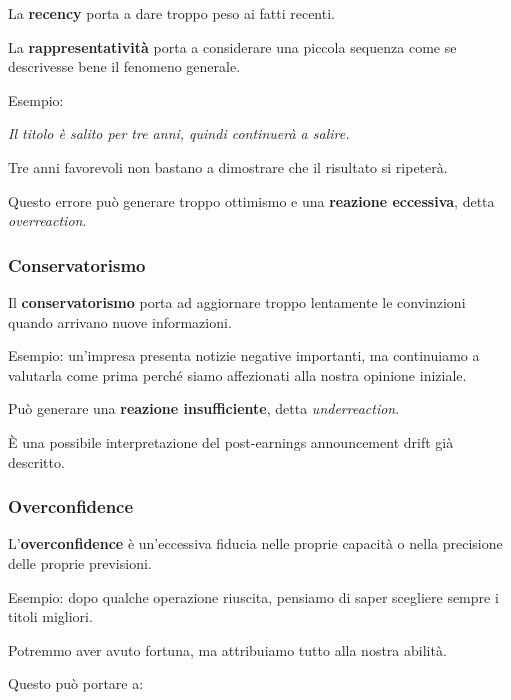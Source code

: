 \noindent La \textbf{recency}
porta a dare troppo peso
ai fatti recenti.

\noindent La \textbf{rappresentatività}
porta a considerare una piccola sequenza
come se descrivesse bene
il fenomeno generale.

\medskip

\noindent Esempio:

\begin{center}
    \textit{Il titolo è salito per tre anni,
    quindi continuerà a salire.}
\end{center}

\noindent Tre anni favorevoli
non bastano a dimostrare
che il risultato si ripeterà.

\noindent Questo errore può generare
troppo ottimismo e una
\textbf{reazione eccessiva},
detta \textit{overreaction}.


\subsubsection*{Conservatorismo}

\noindent Il \textbf{conservatorismo}
porta ad aggiornare troppo lentamente
le convinzioni quando arrivano
nuove informazioni.

\medskip

\noindent Esempio:
un'impresa presenta notizie negative importanti,
ma continuiamo a valutarla come prima
perché siamo affezionati
alla nostra opinione iniziale.

\noindent Può generare una
\textbf{reazione insufficiente},
detta \textit{underreaction}.

\noindent È una possibile interpretazione
del post-earnings announcement drift
già descritto.


\subsubsection*{Overconfidence}

\noindent L'\textbf{overconfidence}
è un'eccessiva fiducia nelle proprie capacità
o nella precisione delle proprie previsioni.

\medskip

\noindent Esempio:
dopo qualche operazione riuscita,
pensiamo di saper scegliere sempre
i titoli migliori.

\noindent Potremmo aver avuto fortuna,
ma attribuiamo tutto alla nostra abilità.

\noindent Questo può portare a:


